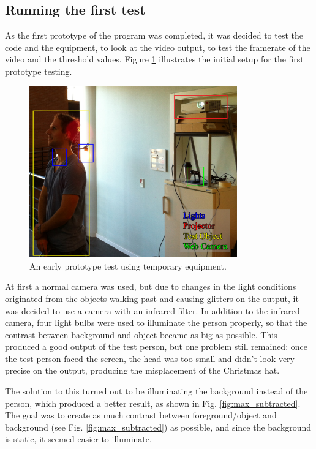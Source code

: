 \subsection{Running the first test}
As the first prototype of the program was completed, it was decided to test the code and the  equipment, to look at the video output, to test the framerate of the video and the threshold values. Figure \ref{fig:ir_cam_test} illustrates the initial setup for the first prototype testing.

\begin{figure}[htbp]
\centering
\includegraphics[width=0.80\textwidth]{Pictures/Test/TestSetup.jpg}
\caption{An early prototype test using temporary equipment.}
\label{fig:ir_cam_test}
\end{figure} 

At first a normal camera was used, but due to changes in the light conditions originated from the objects walking past and causing glitters on the output, it was decided to use a camera with an infrared filter. In addition to the infrared camera, four light bulbs were used to illuminate the person properly, so that the contrast between background and object became as big as possible. This produced a good output of the test person, but one problem still remained: once the test person faced the screen, the head was too small and didn't look very precise on the output, producing the misplacement of the Christmas hat.

The solution to this turned out to be illuminating the background instead of the person, which produced a better result, as shown in Fig. \ref{fig:max_subtracted}. The goal was to create as much contrast between foreground/object and background (see Fig. \ref{fig:max_subtracted}) as possible, and since the background is static, it seemed easier to illuminate.

